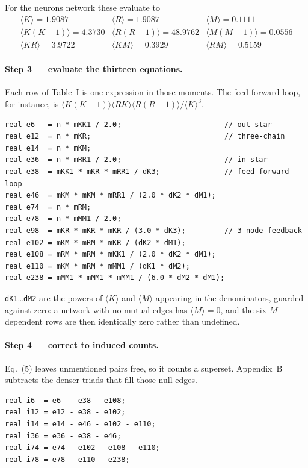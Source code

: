 \documentclass[11pt]{article}
\begin{document}
For the neurons network these evaluate to
\[
\begin{array}{lll}
\langle K\rangle = 1.9087 & \langle R\rangle = 1.9087 & \langle M\rangle = 0.1111\\
\langle K(K-1)\rangle = 4.3730 & \langle R(R-1)\rangle = 48.9762 & \langle M(M-1)\rangle = 0.0556\\
\langle KR\rangle = 3.9722 & \langle KM\rangle = 0.3929 & \langle RM\rangle = 0.5159
\end{array}
\]

\paragraph{Step 3 --- evaluate the thirteen equations.}
Each row of Table~I is one expression in those moments. The feed-forward loop,
for instance, is $\langle K(K-1)\rangle\langle RK\rangle\langle
R(R-1)\rangle/\langle K\rangle^{3}$.

\begin{lstlisting}
real e6   = n * mKK1 / 2.0;                        // out-star
real e12  = n * mKR;                               // three-chain
real e14  = n * mKM;
real e36  = n * mRR1 / 2.0;                        // in-star
real e38  = mKK1 * mKR * mRR1 / dK3;               // feed-forward loop
real e46  = mKM * mKM * mRR1 / (2.0 * dK2 * dM1);
real e74  = n * mRM;
real e78  = n * mMM1 / 2.0;
real e98  = mKR * mKR * mKR / (3.0 * dK3);         // 3-node feedback
real e102 = mKM * mRM * mKR / (dK2 * dM1);
real e108 = mRM * mRM * mKK1 / (2.0 * dK2 * dM1);
real e110 = mKM * mRM * mMM1 / (dK1 * dM2);
real e238 = mMM1 * mMM1 * mMM1 / (6.0 * dM2 * dM1);
\end{lstlisting}

\noindent
\texttt{dK1}\ldots\texttt{dM2} are the powers of $\langle K\rangle$ and
$\langle M\rangle$ appearing in the denominators, guarded against zero: a
network with no mutual edges has $\langle M\rangle=0$, and the six
$M$-dependent rows are then identically zero rather than undefined.

\paragraph{Step 4 --- correct to induced counts.}
Eq.~(5) leaves unmentioned pairs free, so it counts a superset. Appendix~B
subtracts the denser triads that fill those null edges.

\begin{lstlisting}
real i6  = e6  - e38 - e108;
real i12 = e12 - e38 - e102;
real i14 = e14 - e46 - e102 - e110;
real i36 = e36 - e38 - e46;
real i74 = e74 - e102 - e108 - e110;
real i78 = e78 - e110 - e238;
\end{lstlisting}
\end{document}
